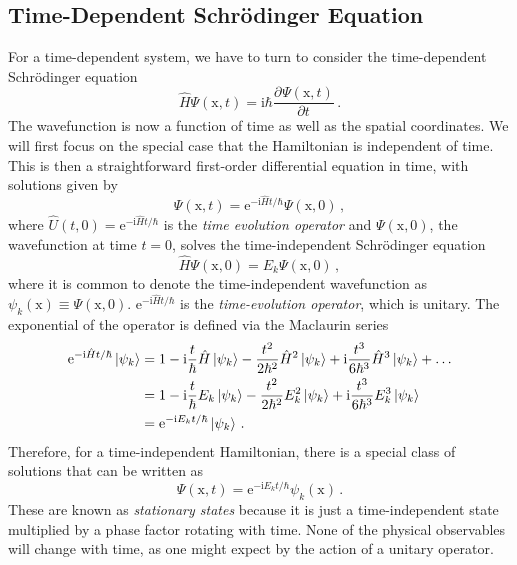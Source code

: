 \documentclass{article}
\theoremstyle{plain}\theoremheaderfont{\normalfont\itshape}\theorembodyfont{\rmfamily}\theoremseparator{.}\newtheorem*{rem}{Remark}\newtheorem*{ex}{Example}\newtheorem*{proof}{Proof}\newtheorem*{altp}{Alternative proof}
\theoremstyle{plain}\theoremheaderfont{\normalfont\bfseries}\theorembodyfont{\rmfamily}\theoremseparator{.}\newtheorem{thm}{Theorem}[section]\newtheorem{lem}[thm]{Lemma}\newtheorem{prop}[thm]{Proposition}\newtheorem*{cor}{Corollary}\newtheorem{defn}[thm]{Definition}\newtheorem{clm}[thm]{Claim}\newtheorem{clminproof}{Claim}
\theoremstyle{break}\theoremheaderfont{\normalfont\itshape}\theorembodyfont{\rmfamily}\theoremseparator{.\medskip}\newtheorem*{proofskip}{Proof}\newtheorem*{exs}{Examples}\newtheorem*{rems}{Remarks}
\theoremstyle{break}\theoremheaderfont{\normalfont\bfseries}\theorembodyfont{\rmfamily}\theoremseparator{.\medskip}\newtheorem{lemskip}[thm]{Lemma}\newtheorem{defnskip}[thm]{Definition}\newtheorem{propskip}[thm]{Proposition}\newtheorem{thmskip}[thm]{Theorem}
\numberwithin{equation}{section}
\newcommand{\ii}{\mathrm{i}}
\newcommand{\ee}{\mathrm{e}}
\newcommand{\pdv}[3][]{\frac{\partial^{#1} #2}{{\partial #3}^{#1}}}
\newcommand{\ket}[1]{\left| #1 \right\rangle}
\newcommand{\vb}[1]{\bm{\mathrm{#1}}}
\begin{document}
    \subsection{Time-Dependent Schr\"{o}dinger Equation}
    For a time-dependent system, we have to turn to consider the time-dependent Schr\"{o}dinger equation
    \begin{equation}
        \hat{H}\Psi(\vb{x},t)=\ii\hbar\pdv{\Psi(\vb{x},t)}{t}\,.
    \end{equation}
    The wavefunction is now a function of time as well as the spatial coordinates. We will first focus on the special case that the Hamiltonian is independent of time. This is then a straightforward first-order differential equation in time, with solutions given by
    \begin{equation}
        \Psi(\vb{x},t)=\ee^{-\ii\hat{H}t/\hbar}\Psi(\vb{x},0)\,,
    \end{equation}
    where \(\hat{U}(t,0)=\ee^{-\ii\hat{H}t/\hbar}\) is the \textit{time evolution operator} and \(\Psi(\vb{x},0)\), the wavefunction at time \(t=0\), solves the time-independent Schr\"{o}dinger equation
    \begin{equation}
        \hat{H}\Psi(\vb{x},0)=E_k\Psi(\vb{x},0)\,,
    \end{equation}
    where it is common to denote the time-independent wavefunction as \(\psi_k(\vb{x})\equiv \Psi(\vb{x},0)\). \(\ee^{-\ii\hat{H}t/\hbar}\) is the \textit{time-evolution operator}, which is unitary. The exponential of the operator is defined via the Maclaurin series
    \begin{align}
        \ee^{-\ii\hat{H}t/\hbar}\ket{\psi_k}&=1-\ii\frac{t}{\hbar}\hat{H}\ket{\psi_k}-\frac{t^2}{2\hbar^2}\hat{H}^2\ket{\psi_k}+\ii\frac{t^3}{6\hbar^3}\hat{H}^3\ket{\psi_k}+\dots\notag \\
        &=1-\ii\frac{t}{\hbar}E_k\ket{\psi_k}-\frac{t^2}{2\hbar^2}E_k^2\ket{\psi_k}+\ii\frac{t^3}{6\hbar^3}E_k^3\ket{\psi_k}\notag \\
        &=\ee^{-\ii E_k t/\hbar}\ket{\psi_k}\,.
    \end{align}
    Therefore, for a time-independent Hamiltonian, there is a special class of solutions that can be written as
    \begin{equation}
        \Psi(\vb{x},t)=\ee^{-\ii E_k t/\hbar}\psi_k(\vb{x})\,.
    \end{equation}
    These are known as \textit{stationary states} because it is just a time-independent state multiplied by a phase factor rotating with time. None of the physical observables will change with time, as one might expect by the action of a unitary operator.
\end{document}
